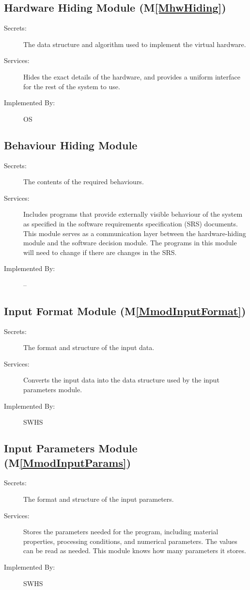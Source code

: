 \documentclass[12pt]{article}
\begin{document}
\subsection{Hardware Hiding Module (M\ref{MhwHiding})}
\label{Sec:HHM()}
\begin{description}
\item[Secrets:]The data structure and algorithm used to implement the virtual hardware.
\item[Services:]Hides the exact details of the hardware, and provides a uniform interface for the rest of the system to use.
\item[Implemented By:]OS
\end{description}
\subsection{Behaviour Hiding Module}
\label{Sec:BHM}
\begin{description}
\item[Secrets:]The contents of the required behaviours.
\item[Services:]Includes programs that provide externally visible behaviour of the system as specified in the software requirements specification (SRS) documents. This module serves as a communication layer between the hardware-hiding module and the software decision module. The programs in this module will need to change if there are changes in the SRS.
\item[Implemented By:]--
\end{description}
\subsection{Input Format Module (M\ref{MmodInputFormat})}
\label{Sec:IFM()}
\begin{description}
\item[Secrets:]The format and structure of the input data.
\item[Services:]Converts the input data into the data structure used by the input parameters module.
\item[Implemented By:]SWHS
\end{description}
\subsection{Input Parameters Module (M\ref{MmodInputParams})}
\label{Sec:IPM()}
\begin{description}
\item[Secrets:]The format and structure of the input parameters.
\item[Services:]Stores the parameters needed for the program, including material properties, processing conditions, and numerical parameters. The values can be read as needed. This module knows how many parameters it stores.
\item[Implemented By:]SWHS
\end{description}
\end{document}
